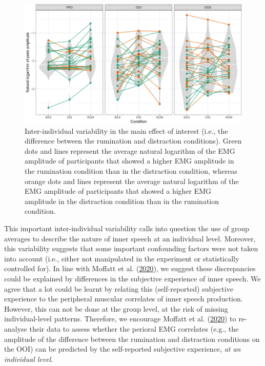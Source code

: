 \documentclass[
  english,
  man, donotrepeattitle,floatsintext]{apa6}
\begin{document}
\begin{figure}[!htb]

{\centering \includegraphics[width=1\linewidth]{manuscript_files/figure-latex/everyone-1} 

}

\caption{Inter-individual variability in the main effect of interest (i.e., the difference between the rumination and distraction conditions). Green dots and lines represent the average natural logarithm of the EMG amplitude of participants that showed a higher EMG amplitude in the rumination condition than in the distraction condition, whereas orange dots and lines represent the average natural logarithm of the EMG amplitude of participants that showed a higher EMG amplitude in the distraction condition than in the rumination condition.}\label{fig:everyone}
\end{figure}

This important inter-individual variability calls into question the use of group averages to describe the nature of inner speech at an individual level. Moreover, this variability suggests that some important confounding factors were not taken into account (i.e., either not manipulated in the experiment or statistically controlled for). In line with Moffatt et al. (\protect\hyperlink{ref-moffatt_inner_2020}{2020}), we suggest these discrepancies could be explained by differences in the subjective experience of inner speech. We agree that a lot could be learnt by relating this (self-reported) subjective experience to the peripheral muscular correlates of inner speech production. However, this can not be done at the group level, at the risk of missing individual-level patterns. Therefore, we encourage Moffatt et al. (\protect\hyperlink{ref-moffatt_inner_2020}{2020}) to re-analyse their data to assess whether the perioral EMG correlates (e.g., the amplitude of the difference between the rumination and distraction conditions on the OOI) can be predicted by the self-reported subjective experience, \emph{at an individual level}.
\end{document}
